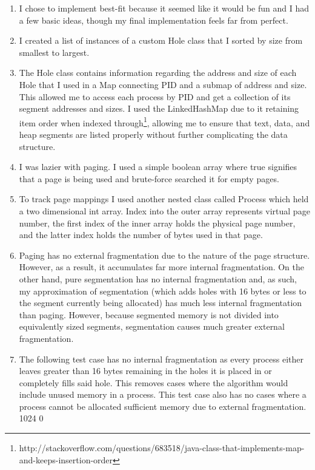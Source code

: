 \documentclass{article}
\begin{document}
\begin{enumerate}
	\item I chose to implement best-fit because it seemed like it would be fun and I had a few basic ideas, though my final implementation feels far from perfect.
	\item I created a list of instances of a custom Hole class that I sorted by size from smallest to largest.
	\item The Hole class contains information regarding the address and size of each Hole that I used in a Map connecting PID and a submap of address and size. This allowed me to access each process by PID and get a collection of its segment addresses and sizes. I used the LinkedHashMap due to it retaining item order when indexed through\footnote{http://stackoverflow.com/questions/683518/java-class-that-implements-map-and-keeps-insertion-order}, allowing me to ensure that text, data, and heap segments are listed properly without further complicating the data structure.
	\item I was lazier with paging. I used a simple boolean array where true signifies that a page is being used and brute-force searched it for empty pages.
	\item To track page mappings I used another nested class called Process which held a two dimensional int array. Index into the outer array represents virtual page number, the first index of the inner array holds the physical page number, and the latter index holds the number of bytes used in that page.
	\item Paging has no external fragmentation due to the nature of the page structure. However, as a result, it accumulates far more internal fragmentation. On the other hand, pure segmentation has no internal fragmentation and, as such, my approximation of segmentation (which adds holes with 16 bytes or less to the segment currently being allocated) has much less internal fragmentation than paging. However, because segmented memory is not divided into equivalently sized segments, segmentation causes much greater external fragmentation.
	\item The following test case has no internal fragmentation as every process either leaves greater than 16 bytes remaining in the holes it is placed in or completely fills said hole. This removes cases where the algorithm would include unused memory in a process. This test case also has no cases where a process cannot be allocated sufficient memory due to external fragmentation.
	1024 0\\

\end{enumerate}
\end{document}
